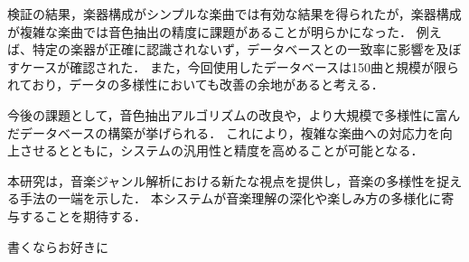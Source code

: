検証の結果，楽器構成がシンプルな楽曲では有効な結果を得られたが，楽器構成が複雑な楽曲では音色抽出の精度に課題があることが明らかになった．
例えば、特定の楽器が正確に認識されないず，データベースとの一致率に影響を及ぼすケースが確認された．
また，今回使用したデータベースは150曲と規模が限られており，データの多様性においても改善の余地があると考える．

今後の課題として，音色抽出アルゴリズムの改良や，より大規模で多様性に富んだデータベースの構築が挙げられる．
これにより，複雑な楽曲への対応力を向上させるとともに，システムの汎用性と精度を高めることが可能となる．

本研究は，音楽ジャンル解析における新たな視点を提供し，音楽の多様性を捉える手法の一端を示した．
本システムが音楽理解の深化や楽しみ方の多様化に寄与することを期待する．



\begin{acknowledgment}
	書くならお好きに
\end{acknowledgment}

